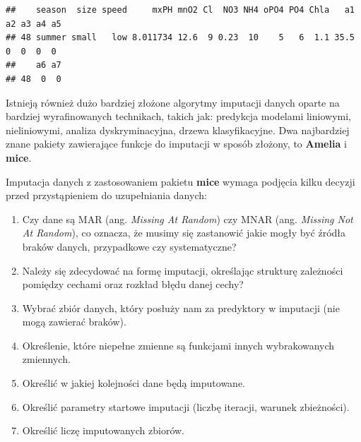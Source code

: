 \documentclass[
]{book}
\newenvironment{Shaded}{\begin{snugshade}}{\end{snugshade}}
\newcommand{\DataTypeTok}[1]{\textcolor[rgb]{0.13,0.29,0.53}{#1}}
\newcommand{\DecValTok}[1]{\textcolor[rgb]{0.00,0.00,0.81}{#1}}
\newcommand{\KeywordTok}[1]{\textcolor[rgb]{0.13,0.29,0.53}{\textbf{#1}}}
\newcommand{\NormalTok}[1]{#1}
\newcommand{\OperatorTok}[1]{\textcolor[rgb]{0.81,0.36,0.00}{\textbf{#1}}}
\newcommand{\StringTok}[1]{\textcolor[rgb]{0.31,0.60,0.02}{#1}}
\providecommand{\tightlist}{%
  \setlength{\itemsep}{0pt}\setlength{\parskip}{0pt}}
\theoremstyle{plain}
\theoremstyle{definition}
\theoremstyle{definition}
\theoremstyle{definition}
\theoremstyle{definition}
\theoremstyle{remark}
\begin{document}
\begin{Shaded}
\end{Shaded}

\begin{verbatim}
##    season  size speed     mxPH mnO2 Cl  NO3 NH4 oPO4 PO4 Chla   a1 a2 a3 a4 a5
## 48 summer small   low 8.011734 12.6  9 0.23  10    5   6  1.1 35.5  0  0  0  0
##    a6 a7
## 48  0  0
\end{verbatim}

Istnieją również dużo bardziej złożone algorytmy imputacji danych oparte na bardziej wyrafinowanych technikach, takich jak: predykcja modelami liniowymi, nieliniowymi, analiza dyskryminacyjna, drzewa klasyfikacyjne. Dwa najbardziej znane pakiety zawierające funkcje do imputacji w sposób złożony, to \textbf{Amelia} i \textbf{mice}.

Imputacja danych z zastosowaniem pakietu \textbf{mice} wymaga podjęcia kilku decyzji przed przystąpieniem do uzupełniania danych:

\begin{enumerate}
\def\labelenumi{\arabic{enumi}.}
\tightlist
\item
  Czy dane są MAR (ang. \emph{Missing At Random}) czy MNAR (ang. \emph{Missing Not At Random}), co oznacza, że musimy się zastanowić jakie mogły być źródła braków danych, przypadkowe czy systematyczne?
\item
  Należy się zdecydować na formę imputacji, określając strukturę zależności pomiędzy cechami oraz rozkład błędu danej cechy?
\item
  Wybrać zbiór danych, który posłuży nam za predyktory w imputacji (nie mogą zawierać braków).
\item
  Określenie, które niepełne zmienne są funkcjami innych wybrakowanych zmiennych.
\item
  Określić w jakiej kolejności dane będą imputowane.
\item
  Określić parametry startowe imputacji (liczbę iteracji, warunek zbieżności).
\item
  Określić liczę imputowanych zbiorów.
\end{enumerate}
\end{document}
